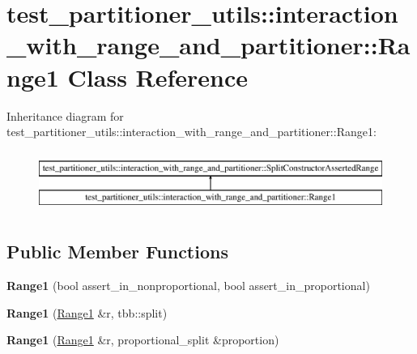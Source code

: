 \hypertarget{classtest__partitioner__utils_1_1interaction__with__range__and__partitioner_1_1Range1}{}\section{test\+\_\+partitioner\+\_\+utils\+:\+:interaction\+\_\+with\+\_\+range\+\_\+and\+\_\+partitioner\+:\+:Range1 Class Reference}
\label{classtest__partitioner__utils_1_1interaction__with__range__and__partitioner_1_1Range1}
Inheritance diagram for test\+\_\+partitioner\+\_\+utils\+:\+:interaction\+\_\+with\+\_\+range\+\_\+and\+\_\+partitioner\+:\+:Range1\+:\begin{figure}[H]
\begin{center}
\leavevmode
\includegraphics[height=2.000000cm]{classtest__partitioner__utils_1_1interaction__with__range__and__partitioner_1_1Range1}
\end{center}
\end{figure}
\subsection*{Public Member Functions}
\begin{DoxyCompactItemize}
\item 
\hypertarget{classtest__partitioner__utils_1_1interaction__with__range__and__partitioner_1_1Range1_a66cdf7761fff899dcaa6d1af555cd2c9}{}{\bfseries Range1} (bool assert\+\_\+in\+\_\+nonproportional, bool assert\+\_\+in\+\_\+proportional)\label{classtest__partitioner__utils_1_1interaction__with__range__and__partitioner_1_1Range1_a66cdf7761fff899dcaa6d1af555cd2c9}

\item 
\hypertarget{classtest__partitioner__utils_1_1interaction__with__range__and__partitioner_1_1Range1_a379956d8921eb1c74ee51400136e8970}{}{\bfseries Range1} (\hyperlink{classtest__partitioner__utils_1_1interaction__with__range__and__partitioner_1_1Range1}{Range1} \&r, tbb\+::split)\label{classtest__partitioner__utils_1_1interaction__with__range__and__partitioner_1_1Range1_a379956d8921eb1c74ee51400136e8970}

\item 
\hypertarget{classtest__partitioner__utils_1_1interaction__with__range__and__partitioner_1_1Range1_a761d0abde4dc1dd3bca1410442903dbe}{}{\bfseries Range1} (\hyperlink{classtest__partitioner__utils_1_1interaction__with__range__and__partitioner_1_1Range1}{Range1} \&r, proportional\+\_\+split \&proportion)\label{classtest__partitioner__utils_1_1interaction__with__range__and__partitioner_1_1Range1_a761d0abde4dc1dd3bca1410442903dbe}

\end{DoxyCompactItemize}
